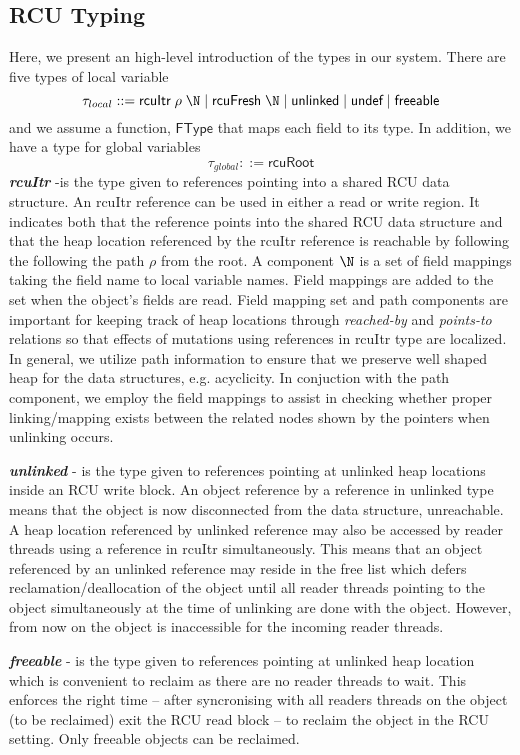 \subsection{\textsf{RCU} Typing}
\label{subsection:rcu-typing}
Here, we present an high-level introduction of the types in our system. There are five types of local variable
\[
\tau_{local} ::=  \textsf{rcuItr}\;\rho\;\N \mid \textsf{rcuFresh}\;\N  \mid \textsf{unlinked} \mid \textsf{undef} \mid \textsf{freeable}
\]
and we assume a function, $\textsf{FType}$ that maps each field to its type. In addition, we have a type for global variables
\[\tau_{global} ::= \textsf{rcuRoot}\]
\textit{\textbf{rcuItr}} -is the type given to references pointing into a shared RCU data structure. An \textsf{rcuItr} reference can be used in either a read or write region. It indicates both that the reference points into the shared \textsf{RCU} data structure and that the heap location referenced by the \textsf{rcuItr} reference is reachable by following the following the path $\rho$ from the root. A component $\N$ is a set of field mappings taking the field name to local variable names. Field mappings are added to the set when the object's fields are read. Field mapping set and path components are important for keeping track of heap locations through \textit{reached-by} and \textit{points-to} relations so that effects of mutations using references in \textsf{rcuItr} type are localized.
In general, we utilize path information to ensure that we preserve well shaped heap for the data structures, e.g. acyclicity. In conjuction with the path component, we employ the field mappings to assist in checking whether proper linking/mapping exists between the related nodes shown by the pointers when unlinking occurs.

\textit{\textbf{unlinked}} - is the type given to references pointing at unlinked heap locations inside an \textsf{RCU} write block. An object reference by a reference in unlinked type means that the object is now disconnected from the data structure, unreachable. A heap location referenced by unlinked reference may also be accessed by reader threads using a reference in \textsf{rcuItr} simultaneously. This means that an object referenced by an unlinked reference may reside in the free list which defers reclamation/deallocation of the object until all reader threads pointing to the object simultaneously at the time of unlinking  are done with the object. However, from now on the object is inaccessible for the incoming reader threads.

\textit{\textbf{freeable}} - is the type given to references pointing at unlinked heap location which is convenient to reclaim as there are no reader threads to wait. This enforces the right time -- after syncronising with all readers threads on the object (to be reclaimed) exit the \textsf{RCU} read block -- to reclaim the object in the \textsf{RCU} setting. Only freeable objects can be reclaimed.

